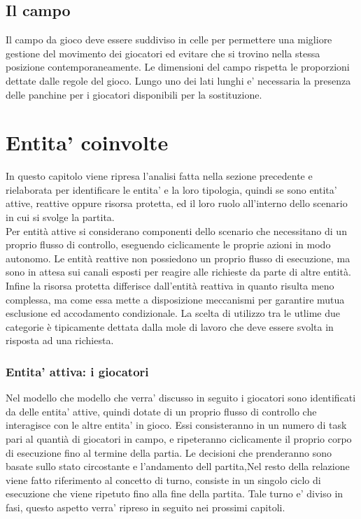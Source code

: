 \subsection{Il campo}
\label{sec:analisi_campo}

Il campo da gioco deve essere suddiviso in celle per permettere una migliore gestione del movimento dei giocatori ed evitare che si trovino nella stessa posizione contemporaneamente. Le dimensioni del campo rispetta le proporzioni dettate dalle regole del gioco. Lungo uno dei lati lunghi e' necessaria la presenza delle panchine per i giocatori disponibili per la sostituzione.

\section*{Entita' coinvolte}

In questo capitolo viene ripresa l’analisi fatta nella sezione precedente e rielaborata per identificare le entita’ e la loro tipologia, quindi se sono entita’ attive, reattive oppure risorsa protetta, ed il loro ruolo all’interno dello scenario in cui si svolge la partita.\\

Per entità attive si considerano componenti dello scenario che necessitano di un proprio flusso di controllo, eseguendo ciclicamente le proprie azioni in modo autonomo. Le entità reattive non possiedono un proprio flusso di esecuzione, ma sono in attesa sui canali esposti per reagire alle richieste da parte di altre entità. Infine la risorsa protetta differisce dall’entità reattiva in quanto risulta meno complessa, ma come essa mette a disposizione meccanismi per garantire mutua esclusione ed accodamento condizionale. La scelta di utilizzo tra le utlime due categorie è tipicamente dettata dalla mole di lavoro che deve essere svolta in risposta ad una richiesta.

\subsubsection{Entita' attiva: i giocatori}
\label{sec:entita_coinvolte_giocatori}

Nel modello che modello che verra’ discusso in seguito i giocatori sono identificati da delle entita’ attive, quindi dotate di un proprio flusso di controllo che interagisce con le altre entita’ in gioco. Essi consisteranno in un numero di task pari al quantià di giocatori in campo, e ripeteranno ciclicamente il proprio corpo di esecuzione fino al termine della partia. Le decisioni che prenderanno sono basate sullo stato circostante e l’andamento dell partita,Nel resto della relazione viene fatto riferimento al concetto di turno, consiste in un singolo ciclo di esecuzione che viene ripetuto fino alla fine della partita. Tale turno e’ diviso in fasi, questo aspetto verra’ ripreso in seguito nei prossimi capitoli.

